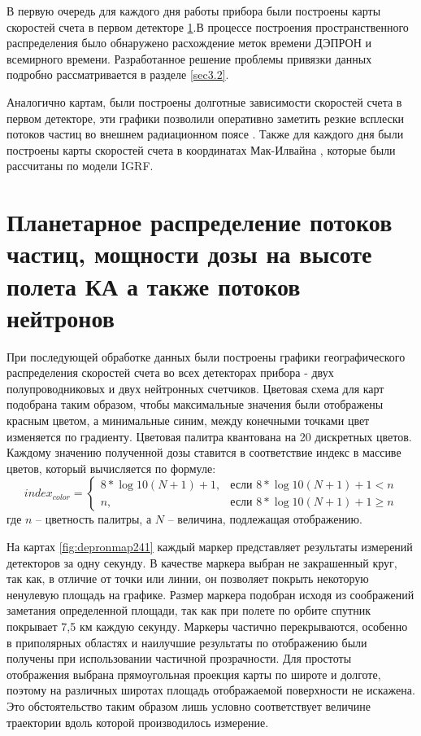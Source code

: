 В первую очередь для каждого дня работы прибора были построены карты скоростей счета в первом детекторе \ref{sec:planetDose}.В процессе построения пространственного распределения было обнаружено расхождение меток времени  ДЭПРОН и всемирного времени. Разработанное решение проблемы привязки данных подробно рассматривается в разделе \ref{sec3.2}.

Аналогично картам, были построены долготные зависимости скоростей счета в первом детекторе, эти графики позволили оперативно заметить резкие всплески потоков частиц во внешнем радиационном поясе \label{sec:flash_analisys}. Также для каждого дня были построены карты скоростей счета в координатах Мак-Илвайна \cite{McIlwain1961}, которые были рассчитаны  по модели IGRF.

\section{Планетарное распределение потоков частиц, мощности дозы на высоте полета КА а также потоков нейтронов} \label{sec:planetDose}
При последующей обработке данных были построены графики географического распределения скоростей счета во всех детекторах прибора - двух полупроводниковых и двух нейтронных счетчиков. Цветовая схема для карт подобрана таким образом, чтобы максимальные значения были отображены красным цветом, а минимальные синим, между конечными точками цвет изменяется по градиенту. Цветовая палитра квантована на 20 дискретных цветов. Каждому значению полученной дозы ставится в соответствие индекс в массиве цветов, который вычисляется по формуле:
\begin{equation*}
index_{color} = \begin{cases}
	8*\log{10}(N + 1)+1,  & \text{если } 8*\log{10}(N + 1) +1 < n \\
	n,  & \text{если } 8*\log{10}(N + 1) +1 \ge n
	\end{cases}
\end{equation*}
		где $ n $ -- цветность палитры, а $ N $ -- величина, подлежащая отображению.
						
%
На картах 	\ref{fig:depronmap241} каждый маркер представляет результаты измерений детекторов за одну секунду. В качестве маркера выбран не закрашенный круг, так как, в отличие от точки или линии, он позволяет покрыть некоторую ненулевую площадь на графике.  Размер маркера подобран исходя из соображений заметания определенной площади, так как при полете по орбите спутник покрывает 7,5 км каждую секунду. Маркеры частично перекрываются, особенно в приполярных областях и наилучшие результаты по отображению были получены при использовании частичной прозрачности. Для простоты отображения выбрана прямоугольная проекция карты по широте и долготе, поэтому на различных широтах площадь отображаемой поверхности не искажена. Это обстоятельство таким образом лишь условно соответствует величине траектории вдоль которой производилось измерение.

